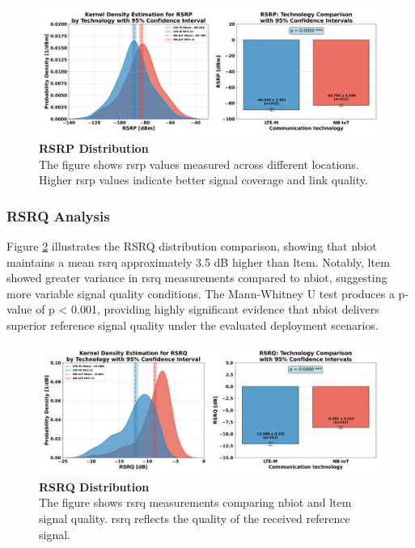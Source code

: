 \documentclass[12pt, english, openany]{book}
\begin{document}
\begin{figure}[htbp]
    \centering
    \includegraphics[width=1.0\textwidth]{rsrp_kde_ci.png}
    \caption{\textbf{RSRP Distribution} \\ The figure shows \gls{rsrp} values measured across different locations. Higher \gls{rsrp} values indicate better signal coverage and link quality.}
    \label{fig:rsrp}
\end{figure}
\FloatBarrier
\subsubsection*{RSRQ Analysis} \label{sec:rsrq_analysis}

Figure \ref{fig:rsrq} illustrates the RSRQ distribution comparison, showing that \gls{nbiot} maintains a mean \gls{rsrq} approximately 3.5 dB higher than \gls{ltem}. Notably, \gls{ltem} showed greater variance in \gls{rsrq} measurements compared to \gls{nbiot}, suggesting more variable signal quality conditions. The Mann-Whitney U test produces a p-value of p < 0.001, providing highly significant evidence that \gls{nbiot} delivers superior reference signal quality under the evaluated deployment scenarios.

\begin{figure}[htbp]
    \centering
    \includegraphics[width=1.0\textwidth]{rsrq_kde_ci.png}
    \caption{\textbf{RSRQ Distribution} \\ The figure shows \gls{rsrq} measurements comparing \gls{nbiot} and \gls{ltem} signal quality. \gls{rsrq} reflects the quality of the received reference signal.}
    \label{fig:rsrq}
\end{figure}
\FloatBarrier
\end{document}
